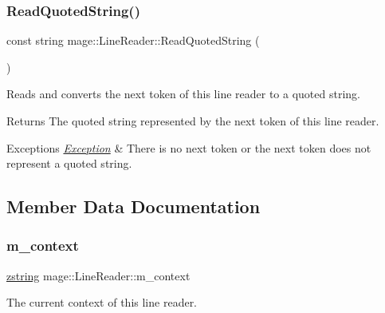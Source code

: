 \subsubsection{\texorpdfstring{Read\+Quoted\+String()}{ReadQuotedString()}}
{\footnotesize\ttfamily const string mage\+::\+Line\+Reader\+::\+Read\+Quoted\+String (\begin{DoxyParamCaption}{ }\end{DoxyParamCaption})\hspace{0.3cm}{\ttfamily [protected]}}

Reads and converts the next token of this line reader to a quoted string.

\begin{DoxyReturn}{Returns}
The quoted string represented by the next token of this line reader. 
\end{DoxyReturn}

\begin{DoxyExceptions}{Exceptions}
{\em \mbox{\hyperlink{classmage_1_1_exception}{Exception}}} & There is no next token or the next token does not represent a quoted string. \\
\hline
\end{DoxyExceptions}


\subsection{Member Data Documentation}
\mbox{\label{classmage_1_1_line_reader_ae1f715152d14188cc490870e307099d8}} 
\subsubsection{\texorpdfstring{m\+\_\+context}{m\_context}}
{\footnotesize\ttfamily \mbox{\hyperlink{namespacemage_a4163ec9a9a27d5e7f4b452dcb99cb2b9}{zstring}} mage\+::\+Line\+Reader\+::m\+\_\+context\hspace{0.3cm}{\ttfamily [protected]}}

The current context of this line reader. \mbox{\label{classmage_1_1_line_reader_a6de3398ac59fdd98f8c40cff6f5c1075}} 

